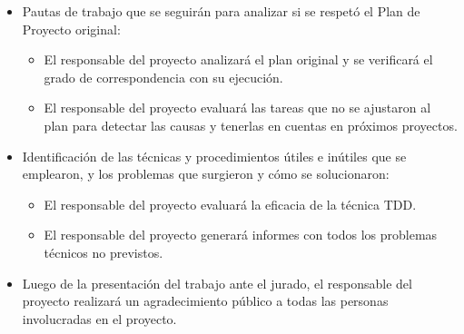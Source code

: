 \documentclass[
11pt, %
]{charter}
\begin{document}
\begin{itemize}
	\item Pautas de trabajo que se seguirán para analizar si se respetó el Plan de Proyecto original:
        \begin{itemize}
            \item El responsable del proyecto analizará el plan original y se verificará el grado de correspondencia con su ejecución.
            \item El responsable del proyecto evaluará las tareas que no se ajustaron al plan para detectar las causas y tenerlas en cuentas en próximos proyectos.
	    \end{itemize}

    \item Identificación de las técnicas y procedimientos útiles e inútiles que se emplearon, y los problemas que surgieron y cómo se solucionaron:
	    \begin{itemize}
            \item El responsable del proyecto evaluará la eficacia de la técnica TDD.
            \item El responsable del proyecto generará informes con todos los problemas técnicos no previstos.
        \end{itemize}
	\item Luego de la presentación del trabajo ante el jurado, el responsable del proyecto realizará un agradecimiento público a todas las personas involucradas en el proyecto. 
\end{itemize}
\end{document}
